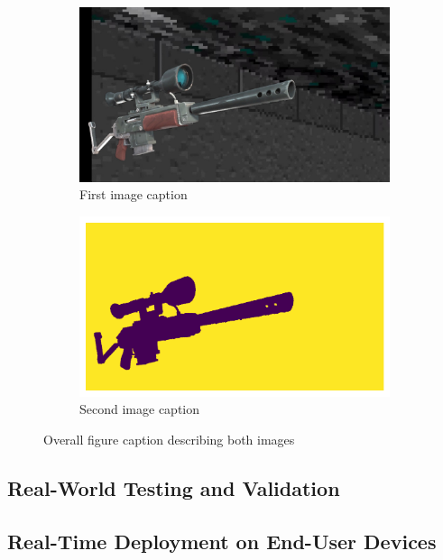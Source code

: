 \begin{figure}[htbp]
    \centering
    \begin{subfigure}{0.48\textwidth}
        \centering
        \includegraphics[width=\textwidth]{ressources/00009.jpg}
        \caption{First image caption}
        \label{fig:first-image}
    \end{subfigure}
    \hfill
    \begin{subfigure}{0.48\textwidth}
        \centering
        \includegraphics[width=\textwidth]{ressources/depth_map.png}
        \caption{Second image caption}
        \label{fig:second-image}
    \end{subfigure}
    \caption{Overall figure caption describing both images}
    \label{fig:double-image}
\end{figure}
\subsection{Real-World Testing and Validation}
\subsection{Real-Time Deployment on End-User Devices}